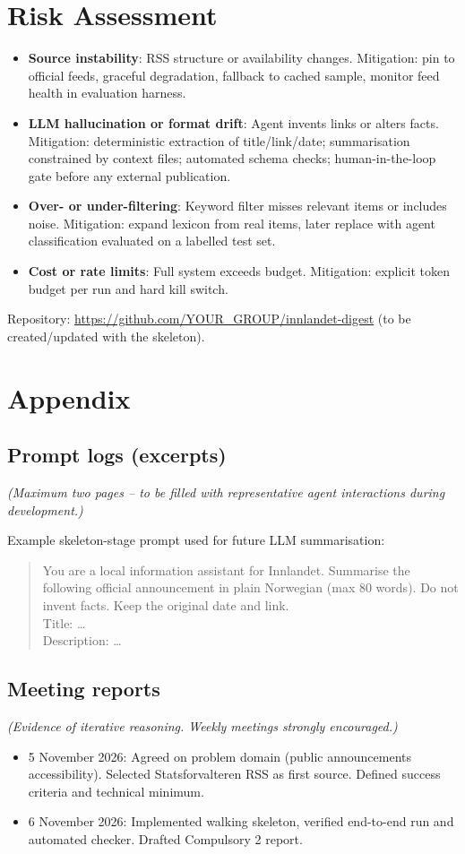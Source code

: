 \documentclass{article}
\begin{document}
\section{Risk Assessment}
\begin{itemize}
  \item \textbf{Source instability}: RSS structure or availability changes. Mitigation: pin to official feeds, graceful degradation, fallback to cached sample, monitor feed health in evaluation harness.
  \item \textbf{LLM hallucination or format drift}: Agent invents links or alters facts. Mitigation: deterministic extraction of title/link/date; summarisation constrained by context files; automated schema checks; human-in-the-loop gate before any external publication.
  \item \textbf{Over- or under-filtering}: Keyword filter misses relevant items or includes noise. Mitigation: expand lexicon from real items, later replace with agent classification evaluated on a labelled test set.
  \item \textbf{Cost or rate limits}: Full system exceeds budget. Mitigation: explicit token budget per run and hard kill switch.
\end{itemize}
Repository: \url{https://github.com/YOUR_GROUP/innlandet-digest} (to be created/updated with the skeleton).

\section*{Appendix}
\subsection*{Prompt logs (excerpts)}
\emph{(Maximum two pages -- to be filled with representative agent interactions during development.)}

Example skeleton-stage prompt used for future LLM summarisation:
\begin{quote}
You are a local information assistant for Innlandet. Summarise the following official announcement in plain Norwegian (max 80 words). Do not invent facts. Keep the original date and link.\\
Title: \ldots\\
Description: \ldots
\end{quote}

\subsection*{Meeting reports}
\emph{(Evidence of iterative reasoning. Weekly meetings strongly encouraged.)}

\begin{itemize}
  \item 5 November 2026: Agreed on problem domain (public announcements accessibility). Selected Statsforvalteren RSS as first source. Defined success criteria and technical minimum.
  \item 6 November 2026: Implemented walking skeleton, verified end-to-end run and automated checker. Drafted Compulsory 2 report.
\end{itemize}
\end{document}
